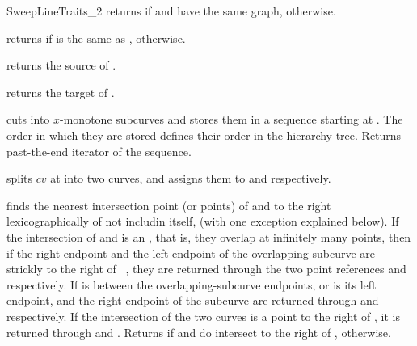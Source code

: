 \begin{ccRefConcept}{SweepLineTraits_2}
  {returns  if  and  have the same graph, 
   otherwise.}

  {returns  if  is the same as , 
  otherwise.}
    

  {returns the source of .}

  {returns the target of .}

	 {cuts  into $x$-monotone subcurves and stores them in a
	 sequence starting at . The order in which they are stored
	 defines their order in the hierarchy tree. Returns past-the-end
	 iterator of the sequence.}

  {splits $cv$ at  into two curves, and assigns them to
   and  respectively.
  }

  {finds the nearest intersection point (or points) of  and 
  to the right lexicographically of  not includin  itself,
  (with one exception explained below).
  If the intersection of  and  is an , that is,
  they overlap at infinitely many points, then if the right endpoint and the
  left endpoint of the overlapping subcurve are strickly to the right of \
  , they are returned through the two point references  and
  \ccc{p2} respectively. If  is between the overlapping-subcurve
  endpoints, or \ccc{pt} is its left endpoint, \ccc{pt} and the right endpoint
  of the subcurve are returned through  and  respectively. If
  the intersection of the two curves is a point to the right of , it
  is returned through \ccc{p1} and \ccc{p2}.
  Returns  if  and  do intersect to the right of
  \ccc{pt}, \ccc{false} otherwise.}


\end{ccRefConcept}
